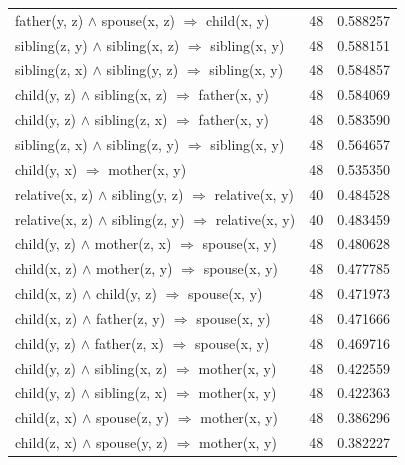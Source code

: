 \begin{longtable}{lrr}
       father(y, z) $\wedge$ spouse(x, z)   $\Rightarrow$ child(x, y) &           48 &        0.588257 \\
   sibling(z, y) $\wedge$ sibling(x, z)   $\Rightarrow$ sibling(x, y) &           48 &        0.588151 \\
   sibling(z, x) $\wedge$ sibling(y, z)   $\Rightarrow$ sibling(x, y) &           48 &        0.584857 \\
      child(y, z) $\wedge$ sibling(x, z)   $\Rightarrow$ father(x, y) &           48 &        0.584069 \\
      child(y, z) $\wedge$ sibling(z, x)   $\Rightarrow$ father(x, y) &           48 &        0.583590 \\
   sibling(z, x) $\wedge$ sibling(z, y)   $\Rightarrow$ sibling(x, y) &           48 &        0.564657 \\
                       child(y, x)   $\Rightarrow$ mother(x, y) &           48 &        0.535350 \\
 relative(x, z) $\wedge$ sibling(y, z)   $\Rightarrow$ relative(x, y) &           40 &        0.484528 \\
 relative(x, z) $\wedge$ sibling(z, y)   $\Rightarrow$ relative(x, y) &           40 &        0.483459 \\
       child(y, z) $\wedge$ mother(z, x)   $\Rightarrow$ spouse(x, y) &           48 &        0.480628 \\
       child(x, z) $\wedge$ mother(z, y)   $\Rightarrow$ spouse(x, y) &           48 &        0.477785 \\
        child(x, z) $\wedge$ child(y, z)   $\Rightarrow$ spouse(x, y) &           48 &        0.471973 \\
       child(x, z) $\wedge$ father(z, y)   $\Rightarrow$ spouse(x, y) &           48 &        0.471666 \\
       child(y, z) $\wedge$ father(z, x)   $\Rightarrow$ spouse(x, y) &           48 &        0.469716 \\
      child(y, z) $\wedge$ sibling(x, z)   $\Rightarrow$ mother(x, y) &           48 &        0.422559 \\
      child(y, z) $\wedge$ sibling(z, x)   $\Rightarrow$ mother(x, y) &           48 &        0.422363 \\
       child(z, x) $\wedge$ spouse(z, y)   $\Rightarrow$ mother(x, y) &           48 &        0.386296 \\
       child(z, x) $\wedge$ spouse(y, z)   $\Rightarrow$ mother(x, y) &           48 &        0.382227 \\

\end{longtable}

